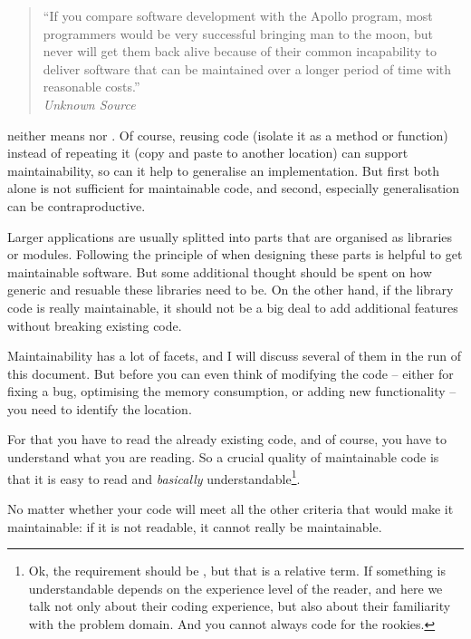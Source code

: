 \begin{quote}
``If you compare software development with the Apollo program, most programmers would be very successful bringing man to the moon, but never will get them back alive because of their common incapability to deliver software that can be maintained over a longer period of time with reasonable costs.'' \\
\textit{Unknown Source} \autocite{UnknownSource1}
\end{quote}

 neither means  nor . Of course, reusing code (isolate it as a method or function) instead of repeating it (copy and paste to another location) can support maintainability, so can it help to generalise an implementation. But first both alone is not sufficient for maintainable code, and second, especially generalisation can be contraproductive.

Larger applications are usually splitted into parts that are organised as libraries or modules. Following the principle of \autocite{WIKIPEDIA:SoC} when designing these parts is helpful to get maintainable software. But some additional thought should be spent on how generic and resuable these libraries need to be. On the other hand, if the library code is really maintainable, it should not be a big deal to add additional features without breaking existing code.

Maintainability has a lot of facets, and I will discuss several of them in the run of this document. But before you can even think of modifying the code – either for fixing a bug, optimising the memory consumption, or adding new functionality – you need to identify the location.  

For that you have to read the already existing code, and of course, you have to understand what you are reading. So a crucial quality of maintainable code is that it is easy to read and \textit{basically} understandable\footnote{Ok, the requirement should be , but that is a relative term. If something is  understandable depends on the experience level of the reader, and here we talk not only about their coding experience, but also about their familiarity with the problem domain. And you cannot always code for the rookies.}.

No matter whether your code will meet all the other criteria that would make it maintainable: if it is not readable, it cannot really be maintainable. 

